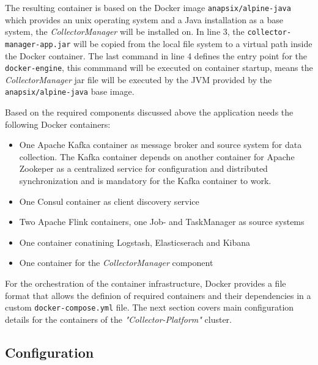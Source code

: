 The resulting container is based on the Docker image \verb|anapsix/alpine-java| which provides an unix operating system and a Java
installation as a base system, the \textit{CollectorManager} will be installed on. In line 3, the \verb|collector-manager-app.jar|
will be copied from the local file system to a virtual path inside the Docker container. The last command in line 4 defines the entry point
for the \verb|docker-engine|, this commmand will be executed on container startup, means the \textit{CollectorManager} jar file will
be executed by the JVM provided by the \verb|anapsix/alpine-java| base image.

Based on the required components discussed above the application needs the following Docker containers:

\begin{itemize}
	\item One Apache Kafka container as message broker and source system for data collection. The Kafka container depends on
	another container for Apache Zookeper as a centralized service for configuration and distributed synchronization and is mandatory
	for the Kafka container to work.
	\item One Consul container as client discovery service
	\item Two Apache Flink containers, one Job- and TaskManager as source systems
	\item One container conatining Logstash, Elasticserach and Kibana
	\item One container for the \textit{CollectorManager} component
\end{itemize}

For the orchestration of the container infrastructure, Docker provides a file format that allows the definion of required containers
and their dependencies in a custom \verb|docker-compose.yml| file. The next section covers main configuration details for the containers
of the \textit{"Collector-Platform"} cluster.

\subsection{Configuration}

